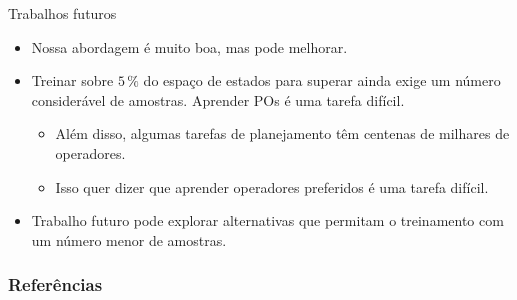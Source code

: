 \documentclass{beamer}
\begin{document}
\begin{frame}{Trabalhos futuros}
\begin{itemize}
  \item Nossa abordagem é muito boa, mas pode melhorar.
  \pause
  \item Treinar sobre $5\,\%$ do espaço de estados para superar \poff ainda exige um número considerável de amostras. Aprender POs é uma tarefa \alert{difícil}.
  \begin{itemize}
    \pause
    \item Além disso, algumas tarefas de planejamento têm \alert{centenas de milhares de operadores}.
    \pause
    \item Isso quer dizer que aprender operadores preferidos é uma tarefa \alert{difícil}.
  \end{itemize}
  \pause
  \item Trabalho futuro pode explorar alternativas que permitam o treinamento com um \alert{número menor de amostras}.
\end{itemize}
\end{frame}


\begin{frame}[allowframebreaks]
\frametitle{Referências}
\printbibliography
\end{frame}
\end{document}
